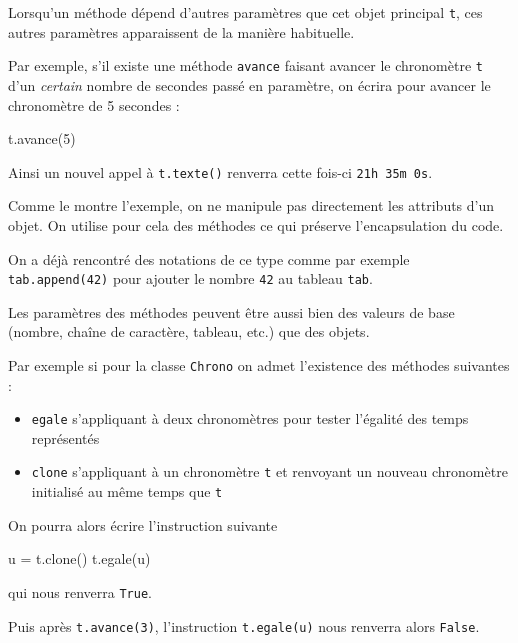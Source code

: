 \documentclass[a4paper,17pt]{extarticle}
\providecommand{\tightlist}{%
      \setlength{\itemsep}{0pt}\setlength{\parskip}{0pt}}
\newenvironment{Shaded}{}{}
\newcommand{\DecValTok}[1]{\textcolor[rgb]{0.25,0.63,0.44}{{#1}}}
\newcommand{\NormalTok}[1]{{#1}}
\newcommand{\OperatorTok}[1]{\textcolor[rgb]{0.40,0.40,0.40}{{#1}}}
\begin{document}
Lorsqu'un méthode dépend d'autres paramètres que cet objet principal
\texttt{t}, ces autres paramètres apparaissent de la manière habituelle.
\begin{exemple}
    Par exemple, s'il existe une méthode \texttt{avance} faisant avancer le
chronomètre \texttt{t} d'un \emph{certain} nombre de secondes passé en
paramètre, on écrira pour avancer le chronomètre de 5 secondes :

\begin{Shaded}
\begin{Highlighting}[]
\NormalTok{t.avance(}\DecValTok{5}\NormalTok{)}
\end{Highlighting}
\end{Shaded}

Ainsi un nouvel appel à \texttt{t.texte()} renverra cette fois-ci
\texttt{\textquotesingle{}21h\ 35m\ 0s\textquotesingle{}}.

        \end{exemple}\begin{remarque}
    Comme le montre l'exemple, on ne manipule pas directement les attributs
d'un objet. On utilise pour cela des méthodes ce qui préserve
l'encapsulation du code.

        \end{remarque}\begin{exemple}
    On a déjà rencontré des notations de ce type comme par exemple
\texttt{tab.append(42)} pour ajouter le nombre \texttt{42} au tableau
\texttt{tab}.

        \end{exemple}
    Les paramètres des méthodes peuvent être aussi bien des valeurs de base
(nombre, chaîne de caractère, tableau, etc.) que des objets.
\begin{exemple}
    Par exemple si pour la classe \texttt{Chrono} on admet l'existence des
méthodes suivantes :

\begin{itemize}
\tightlist
\item
  \texttt{egale} s'appliquant à deux chronomètres pour tester l'égalité
  des temps représentés
\item
  \texttt{clone} s'appliquant à un chronomètre \texttt{t} et renvoyant
  un nouveau chronomètre initialisé au même temps que \texttt{t}
\end{itemize}

On pourra alors écrire l'instruction suivante

\begin{Shaded}
\begin{Highlighting}[]
\NormalTok{u }\OperatorTok{=}\NormalTok{ t.clone()}
\NormalTok{t.egale(u)}
\end{Highlighting}
\end{Shaded}

qui nous renverra \texttt{True}.

Puis après \texttt{t.avance(3)}, l'instruction \texttt{t.egale(u)} nous
renverra alors \texttt{False}.

        \end{exemple}
\end{document}
